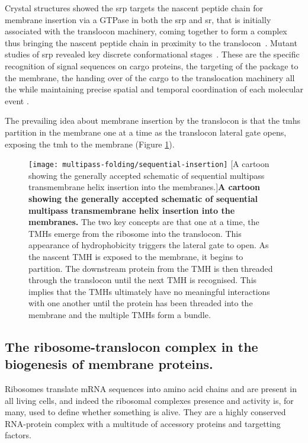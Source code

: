 Crystal structures showed the \gls{srp} targets the nascent peptide chain for membrane insertion via a GTPase in both the \gls{srp} and \gls{sr}, that is initially associated with the translocon machinery, coming together to form a complex thus bringing the nascent peptide chain in proximity to the translocon~\cite{Shan2005}.
Mutant studies of \gls{srp} revealed key discrete conformational stages~\cite{Shan2005}.
These are the specific recognition of signal sequences on cargo proteins, the targeting of the package to the membrane, the handing over of the cargo to the translocation machinery all the while maintaining precise spatial and temporal coordination of each molecular event \cite{Saraogi2011}.


The prevailing idea about membrane insertion by the translocon is that the \gls{tmh}s partition in the membrane one at a time as the translocon lateral gate opens, exposing the \gls{tmh} to the membrane (Figure \ref{fig:sequential-insertion})\cite{Cymer2015}.

\begin{figure}[!ht]
\centering
\texttt{[image: multipass-folding/sequential-insertion]}
        [A cartoon showing the generally accepted schematic of sequential multipass transmembrane helix insertion into the membranes.]{\textbf{A cartoon showing the generally accepted schematic of sequential multipass transmembrane helix insertion into the membranes.}
        The two key concepts are that one at a time, the TMHs emerge from the ribosome into the translocon.
        This appearance of hydrophobicity triggers the lateral gate to open.
        As the nascent TMH is exposed to the membrane, it begins to partition.
        The downstream protein from the TMH is then threaded through the translocon until the next TMH is recognised.
        This implies that the TMHs ultimately have no meaningful interactions with one another until the protein has been threaded into the membrane and the multiple TMHs form a bundle.
}
\label{fig:sequential-insertion}
\end{figure}

\subsection{The ribosome-translocon complex in the biogenesis of membrane proteins.}
Ribosomes translate mRNA sequences into amino acid chains and are present in all living cells, and indeed the ribosomal complexes presence and activity is, for many, used to define whether something is alive.
They are a highly conserved RNA-protein complex with a multitude of accessory proteins and targetting factors.

